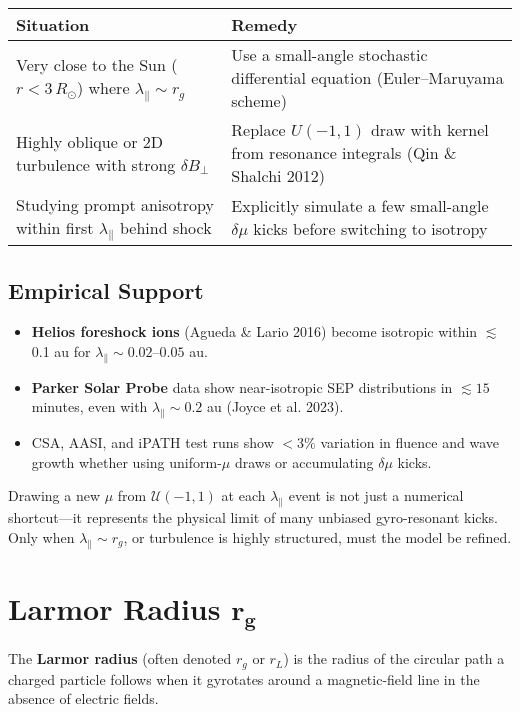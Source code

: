 {\begin{tabular}{@{}p{}p{}@{}}
\toprule
\textbf{Situation} & \textbf{Remedy} \\
\midrule
Very close to the Sun ($r < 3\,R_\odot$) where $\lambda_\parallel \sim r_g$ &
Use a small-angle stochastic differential equation (Euler–Maruyama scheme) \\
\addlinespace
Highly oblique or 2D turbulence with strong $\delta B_\perp$ &
Replace $U(-1,1)$ draw with kernel from resonance integrals (Qin \& Shalchi 2012) \\
\addlinespace
Studying prompt anisotropy within first $\lambda_\parallel$ behind shock &
Explicitly simulate a few small-angle $\delta\mu$ kicks before switching to isotropy \\
\bottomrule
\end{tabular}

\subsection*{Empirical Support}

\begin{itemize}
  \item \textbf{Helios foreshock ions} (Agueda \& Lario 2016) become isotropic within $\lesssim$0.1 au for $\lambda_\parallel \sim 0.02$–$0.05$ au.
  \item \textbf{Parker Solar Probe} data show near-isotropic SEP distributions in $\lesssim 15$ minutes, even with $\lambda_\parallel \sim 0.2$ au (Joyce et al. 2023).
  \item CSA, AASI, and iPATH test runs show $< 3\%$ variation in fluence and wave growth whether using uniform-$\mu$ draws or accumulating $\delta\mu$ kicks.
\end{itemize}

\begin{tcolorbox}[title=Bottom Line]
Drawing a new $\mu$ from $\mathcal{U}(-1, 1)$ at each $\lambda_\parallel$ event is not just a numerical shortcut—it represents the physical limit of many unbiased gyro-resonant kicks. Only when $\lambda_\parallel \sim r_g$, or turbulence is highly structured, must the model be refined.
\end{tcolorbox}

\section*{Larmor Radius $\bm{r_g}$}

\noindent
The \textbf{Larmor radius} (often denoted $r_g$ or $r_L$) is the radius of the circular path a charged particle follows when it gyrotates around a magnetic-field line in the absence of electric fields.

}
